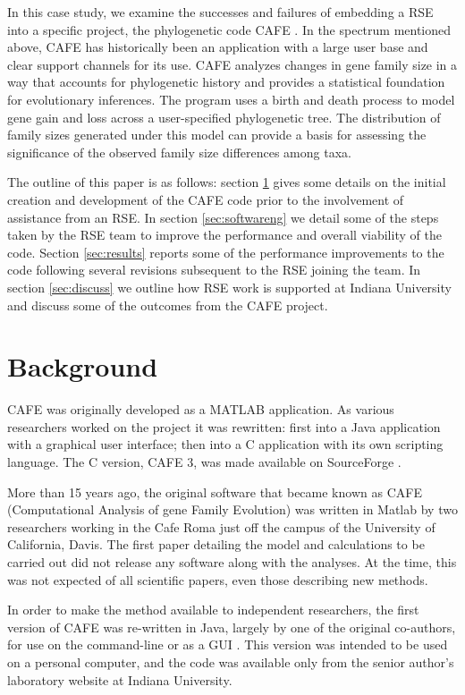 \documentclass[acmtog, authorversion]{acmart}
\begin{document}
In this case study, we examine the successes and failures of embedding a RSE into a specific project, the phylogenetic code CAFE \cite{Hahn2005}. In the spectrum mentioned above, CAFE has historically been an application with a large user base and clear support channels for its use. CAFE analyzes changes in gene family size in a way that accounts for phylogenetic history and provides a statistical foundation for evolutionary inferences. The program uses a birth and death process to model gene gain and loss across a user-specified phylogenetic tree. The distribution of family sizes generated under this model can provide a basis for assessing the significance of the observed family size differences among taxa.

The outline of this paper is as follows: section \ref{sec:background} gives some details on the initial creation and development of the CAFE code prior to the involvement of assistance from an RSE. In section \ref{sec:softwareng} we detail some of the steps taken by the RSE team to improve the performance and overall viability of the code. Section \ref{sec:results} reports some of the performance improvements to the code following several revisions subsequent to the RSE joining the team. In section \ref{sec:discuss} we outline how RSE work is supported at Indiana University and discuss some of the outcomes from the CAFE project. 

\section{Background} \label{sec:background}
CAFE was originally developed as a MATLAB application. As various researchers worked on the project it was rewritten: first into a Java application with a graphical user interface; then into a C application with its own scripting language. The C version, CAFE 3, was made available on SourceForge \cite{SourceForge}. 

More than 15 years ago, the original software that became known as CAFE (Computational Analysis of gene Family Evolution) was written in Matlab by two researchers working in the Cafe Roma just off the campus of the University of California, Davis. The first paper \cite{Hahn2005} detailing the model and calculations to be carried out did not release any software along with the analyses. At the time, this was not expected of all scientific papers, even those describing new methods.

In order to make the method available to independent researchers, the first version of CAFE was re-written in Java, largely by one of the original co-authors, for use on the command-line or as a GUI \cite{DeBie2006}. This version was intended to be used on a personal computer, and the code was available only from the senior author’s laboratory website at Indiana University.
\end{document}
